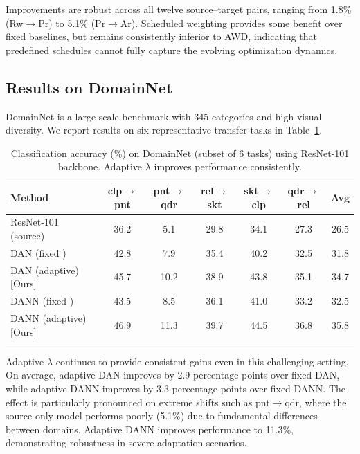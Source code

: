 \documentclass[pdflatex,sn-mathphys-num]{sn-jnl}
\theoremstyle{thmstyleone}
\theoremstyle{thmstyletwo}
\theoremstyle{thmstylethree}
\begin{document}
Improvements are robust across all twelve source--target pairs, ranging from 1.8\% (Rw$\to$Pr) to 5.1\% (Pr$\to$Ar). Scheduled weighting provides some benefit over fixed baselines, but remains consistently inferior to AWD, indicating that predefined schedules cannot fully capture the evolving optimization dynamics.

\subsection{Results on DomainNet}

DomainNet is a large-scale benchmark with 345 categories and high visual diversity. We report results on six representative transfer tasks in Table~\ref{tab:domainnet}.

\begin{table}[t]
\caption{Classification accuracy (\%) on DomainNet (subset of 6 tasks) using ResNet-101 backbone. Adaptive $\lambda$ improves performance consistently.}\label{tab:domainnet}
\begin{tabular*}{\textwidth}{@{\extracolsep\fill}lcccccc}
\toprule
Method & clp$\to$pnt & pnt$\to$qdr & rel$\to$skt & skt$\to$clp & qdr$\to$rel & Avg \\
\midrule
ResNet-101 (source) & 36.2 & 5.1 & 29.8 & 34.1 & 27.3 & 26.5 \\
\midrule
DAN (fixed \textrm{\cite{long2015dan}}) & 42.8 & 7.9 & 35.4 & 40.2 & 32.5 & 31.8 \\
DAN (adaptive) [Ours] & 45.7 & 10.2 & 38.9 & 43.8 & 35.1 & 34.7 \\
\midrule
DANN (fixed \textrm{\cite{ganin2016dann}}) & 43.5 & 8.5 & 36.1 & 41.0 & 33.2 & 32.5 \\
DANN (adaptive) [Ours] & 46.9 & 11.3 & 39.7 & 44.5 & 36.8 & 35.8 \\
\botrule
\end{tabular*}
\end{table}




Adaptive $\lambda$ continues to provide consistent gains even in this challenging setting.
On average, adaptive DAN improves by 2.9 percentage points over fixed DAN, while adaptive DANN improves by 3.3 percentage points over fixed DANN.
The effect is particularly pronounced on extreme shifts such as pnt$\to$qdr, where the source-only model performs poorly (5.1\%) due to fundamental differences between domains. Adaptive DANN improves performance to 11.3\%, demonstrating robustness in severe adaptation scenarios.
\end{document}
